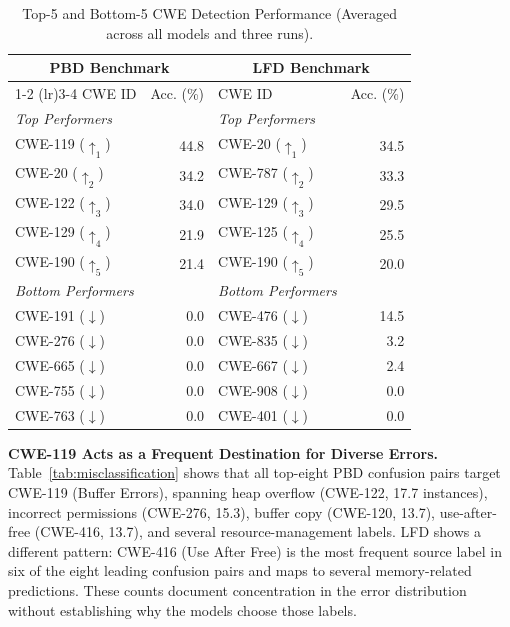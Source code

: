 \documentclass[lettersize,journal]{IEEEtran}
\begin{document}
\begin{table}[!t]
    \centering%
    \caption{Top-5 and Bottom-5 \gls{CWE} Detection Performance (Averaged across all models and three runs).}
    \label{tab:cwe_performance}
    \footnotesize
    \renewcommand{\arraystretch}{1.0}
    \setlength{\tabcolsep}{4pt}
    \begin{tabular*}{\columnwidth}{@{\extracolsep{\fill}}lrlr}
    \toprule
    \multicolumn{2}{c}{\textbf{PBD Benchmark}} & \multicolumn{2}{c}{\textbf{LFD Benchmark}} \\
    \cmidrule(lr){1-2} \cmidrule(lr){3-4}
    CWE ID & Acc. (\%) & CWE ID & Acc. (\%) \\
    \midrule
    \textit{Top Performers} & & \textit{Top Performers} & \\
    CWE-119 \tiny($\uparrow_1$) & 44.8 & CWE-20 \tiny($\uparrow_1$) & 34.5 \\
    CWE-20 \tiny($\uparrow_2$) & 34.2 & CWE-787 \tiny($\uparrow_2$) & 33.3 \\
    CWE-122 \tiny($\uparrow_3$) & 34.0 & CWE-129 \tiny($\uparrow_3$) & 29.5 \\
    CWE-129 \tiny($\uparrow_4$) & 21.9 & CWE-125 \tiny($\uparrow_4$) & 25.5 \\
    CWE-190 \tiny($\uparrow_5$) & 21.4 & CWE-190 \tiny($\uparrow_5$) & 20.0 \\
    \midrule
    \textit{Bottom Performers} & & \textit{Bottom Performers} & \\
    CWE-191 \tiny($\downarrow$) & 0.0 & CWE-476 \tiny($\downarrow$) & 14.5 \\
    CWE-276 \tiny($\downarrow$) & 0.0 & CWE-835 \tiny($\downarrow$) & 3.2 \\
    CWE-665 \tiny($\downarrow$) & 0.0 & CWE-667 \tiny($\downarrow$) & 2.4 \\
    CWE-755 \tiny($\downarrow$) & 0.0 & CWE-908 \tiny($\downarrow$) & 0.0 \\
    CWE-763 \tiny($\downarrow$) & 0.0 & CWE-401 \tiny($\downarrow$) & 0.0 \\
    \bottomrule
    \end{tabular*}
\end{table}

\textbf{CWE-119 Acts as a Frequent Destination for Diverse Errors.} Table~\ref{tab:misclassification} shows that all top-eight PBD confusion pairs target CWE-119 (Buffer Errors), spanning heap overflow (CWE-122, 17.7 instances), incorrect permissions (CWE-276, 15.3), buffer copy (CWE-120, 13.7), use-after-free (CWE-416, 13.7), and several resource-management labels. LFD shows a different pattern: CWE-416 (Use After Free) is the most frequent source label in six of the eight leading confusion pairs and maps to several memory-related predictions. These counts document concentration in the error distribution without establishing why the models choose those labels.
\end{document}
